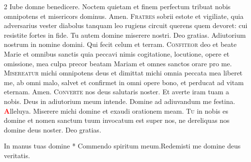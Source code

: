 \begin{multicols}{2}
\vspace{+1em}
\newline {}
\newline {} Iube domne benedicere.
\newline {} Noctem quietam et finem perfectum tribuat nobis omnipotens et misericors dominus. \R Amen. 
\lettrine[lines=2]{\zallmancaps \color{Blue} F}{ratres} sobrii estote et vigiliate, quia adversarius vester diabolus tanquam leo rugiens circuit querens quem devoret: cui resistite fortes in fide. Tu autem domine miserere nostri. \R Deo gratias.
\newline {} Adiutorium nostrum in nomine domini. \R Qui fecit celum et terram.
\newline {}
\newline {}
\lettrine[lines=2]{\zallmancaps \color{Red} C}{onfiteor} deo et beate Marie et omnibus sanctis quia peccavi nimis cogitatione, locutione, opere et omissione, mea culpa precor beatam Mariam et omnes sanctos orare pro me.
\newline {}
\lettrine[lines=2]{\zallmancaps \color{Blue} M}{isereatur} michi omnipotens deus et dimittat michi omnia peccata mea liberet me, ab omni malo, salvet et confirmet in omni opere bono, et perducat ad vitam eternam. \R Amen.
\newline {}
\lettrine[lines=2]{\zallmancaps \color{Red} C}{onverte} nos deus salutaris noster. \R Et averte iram tuam a nobis. \V Deus in adiutorium meum intende. \R Domine ad adiuvandum me festina. 
\newline \doxology \textcolor{Red}{\bfseries A}lleluya.
\newline {} Miserere michi domine et exaudi orationem meam.
\newline {}
\lettrine[lines=2]{\zallmancaps \color{Blue} T}{u} in nobis es domine et nomen sanctum tuum invocatum est super nos, ne dereliquas nos domine deus noster. \R Deo gratias.
\begin{responsory-breve-full}
{In manus tuas domine * Commendo spiritum meum.}{Redemisti me domine deus veritatis.}
\end{responsory-breve-full}%
\newline {}
\end{multicols}
